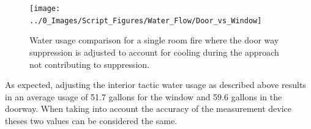 \documentclass[12pt,oneside]{book}
\begin{document}
\begin{figure}[H]
\centering
\texttt{[image: ../0\_Images/Script\_Figures/Water\_Flow/Door\_vs\_Window]}
\caption[Water Usage For Single Room]{Water usage comparison for a single room fire where the door way suppression is adjusted to account for cooling during the approach not contributing to suppression.}
\label{fig:Door_vs_window}
\end{figure}

As expected, adjusting the interior tactic water usage as described above results in an average usage of 51.7 gallons for the window and 59.6 gallons in the doorway. When taking into account the accuracy of the measurement device theses two values can be considered the same.  




\end{document}

